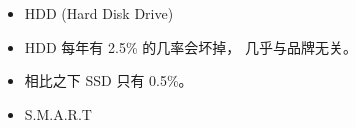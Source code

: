 
\begin{issues}
\issueDraft
\end{issues}

\begin{itemize}
\item HDD (Hard Disk Drive)
\item HDD 每年有 2.5\% 的几率会坏掉， 几乎与品牌无关。
\item 相比之下 SSD 只有 0.5\%。
\item S.M.A.R.T
\end{itemize}
